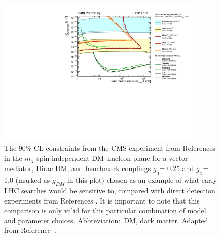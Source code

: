 \documentclass{ar-1col}
\newcommand{\chiDM}{\ensuremath{\chi}\xspace}
\newcommand{\gDM}{\ensuremath{g_{\chiDM}}\xspace}
\newcommand{\gdm}{\gDM}
\newcommand{\gq}{$g_{\mathrm{q}}$\xspace}
\newcommand{\mdm}{\ensuremath{m_{\chiDM}}\xspace}
\begin{document}
\clearpage

\begin{figure}[!htpb]
\includegraphics[width=0.9\textwidth]{figs_standalone/SI_CMSDD_Summary}
\caption{The 90\%-CL constraints from the CMS experiment 
from References \cite{Sirunyan:2017nvi,Sirunyan:2018xlo,Sirunyan:2017jix,CMS-PAS-EXO-16-053,Sirunyan:2017qfc}
in the \mdm-spin-independent DM--nucleon plane for a vector mediator,
Dirac DM, and benchmark couplings \gq = 0.25 and \gdm = 1.0 (marked as $g_{DM}$ in this plot) chosen as an example of what
early LHC searches would be sensitive to, compared with direct detection
experiments from References \cite{Angloher:2015ewa,Agnese:2015nto,Cui:2017nnn,Akerib:2016vxi,Aprile:2018dbl}. 
It is important to note that this comparison is only valid for this particular
combination of model and parameter choices. 
Abbreviation:\ DM, dark matter. Adapted from Reference~.} \label{fig:SICMS}
\end{figure}
\end{document}
